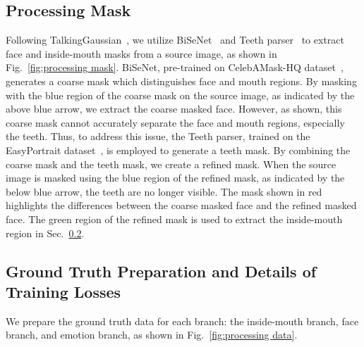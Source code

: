 \subsection{Processing Mask}
\label{sec:processing mask}
Following TalkingGaussian~\cite{li2024talkinggaussian}, we utilize BiSeNet~\cite{yu2018bisenet} and Teeth parser~\cite{li2024talkinggaussian} to extract face and inside-mouth masks from a source image, as shown in Fig.~\ref{fig:processing mask}. BiSeNet, pre-trained on CelebAMask-HQ dataset~\cite{lee2020maskgan}, generates a coarse mask which distinguishes face and mouth regions. By masking with the blue region of the coarse mask on the source image, as indicated by the above blue arrow, we extract the coarse masked face. However, as shown, this coarse mask cannot accurately separate the face and mouth regions, especially the teeth. Thus, to address this issue, the Teeth parser, trained on the EasyPortrait dataset~\cite{kvanchiani2023easyportrait}, is employed to generate a teeth mask. By combining the coarse mask and the teeth mask, we create a refined mask. When the source image is masked using the blue region of the refined mask, as indicated by the below blue arrow, the teeth are no longer visible. The mask shown in red highlights the differences between the coarse masked face and the refined masked face. The green region of the refined mask is used to extract the inside-mouth region in Sec.~\ref{sec:ground truth preparation and trainig losses}.


\subsection{Ground Truth Preparation and Details of Training Losses}
\label{sec:ground truth preparation and trainig losses}
We prepare the ground truth data for each branch: the inside-mouth branch, face branch, and emotion branch, as shown in Fig.~\ref{fig:processing data}. 

